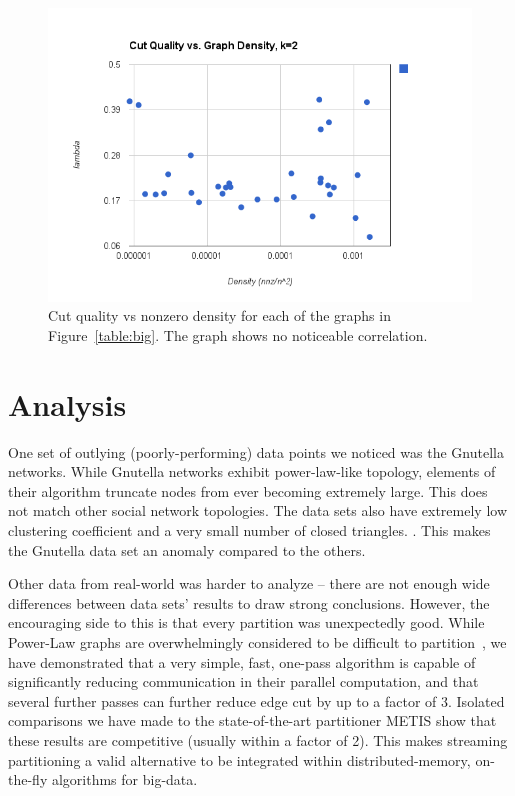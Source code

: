 \documentclass[11pt]{article}
\begin{document}
\begin{figure}[h!]
\centering
\includegraphics[scale=0.65] {figures/cutvsdens}
\caption[Caption for]{Cut quality vs nonzero density for each of the graphs in Figure~\ref{table:big}. The graph shows no noticeable correlation.}
\end{figure}


\section{Analysis}

One set of outlying (poorly-performing) data points we noticed was the Gnutella networks. While Gnutella networks exhibit power-law-like topology, elements of their algorithm truncate nodes from ever becoming extremely large. This does not match other social network topologies. The data sets also have extremely low clustering coefficient and a very small number of closed triangles. \cite{Ripeanu:2002:MGN:613352.613670}. This makes the Gnutella data set an anomaly compared to the others. 

Other data from real-world was harder to analyze -- there are not enough wide differences between data sets' results to draw strong conclusions. However, the encouraging side to this is that every partition was unexpectedly good. While Power-Law graphs are overwhelmingly considered to be difficult to partition~\cite{Abou-Rjeili:2006:MAP:1898953.1899055}, we have demonstrated that a very simple, fast, one-pass algorithm is capable of significantly reducing communication in their parallel computation, and that several further passes can further reduce edge cut by up to a factor of 3. Isolated comparisons we have made to the state-of-the-art partitioner METIS show that these results are competitive (usually within a factor of 2). This makes streaming partitioning a valid alternative to be integrated within distributed-memory, on-the-fly algorithms for big-data.
\end{document}
